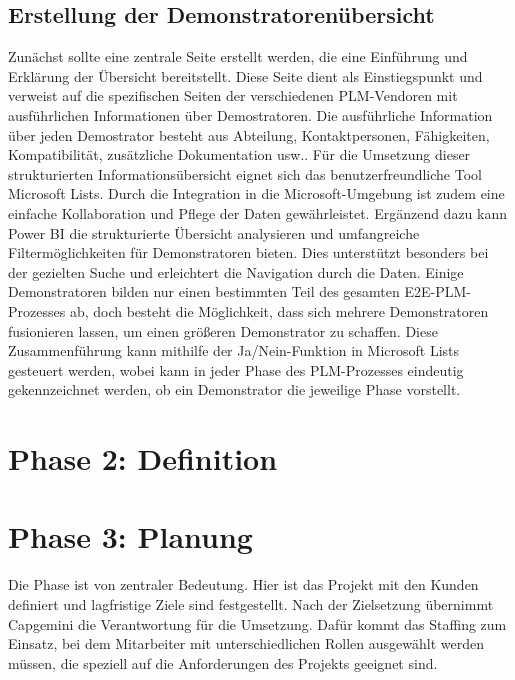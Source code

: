 \documentclass[a4paper, 12pt]{scrartcl}
\begin{document}
	\subsection{Erstellung der Demonstratorenübersicht}
Zunächst sollte eine zentrale Seite erstellt werden, die eine Einführung und Erklärung der Übersicht bereitstellt. Diese Seite dient als Einstiegspunkt und verweist auf die spezifischen Seiten der verschiedenen PLM-Vendoren mit ausführlichen Informationen über Demostratoren. Die ausführliche Information über jeden Demostrator besteht aus Abteilung, Kontaktpersonen, Fähigkeiten, Kompatibilität, zusätzliche Dokumentation usw.. Für die Umsetzung dieser strukturierten Informationsübersicht eignet sich das benutzerfreundliche Tool Microsoft Lists.\cite{List} Durch die Integration in die Microsoft-Umgebung ist zudem eine einfache Kollaboration und Pflege der Daten gewährleistet.\newline
Ergänzend dazu kann Power BI \cite{Power_bi} die strukturierte Übersicht analysieren und umfangreiche Filtermöglichkeiten für Demonstratoren bieten. Dies unterstützt besonders bei der gezielten Suche und erleichtert die Navigation durch die Daten.
Einige Demonstratoren bilden nur einen bestimmten Teil des gesamten E2E-PLM-Prozesses ab, doch besteht die Möglichkeit, dass sich mehrere Demonstratoren fusionieren lassen, um einen größeren Demonstrator zu schaffen. Diese Zusammenführung kann mithilfe der Ja/Nein-Funktion in Microsoft Lists gesteuert werden, wobei kann in jeder Phase des PLM-Prozesses eindeutig gekennzeichnet werden, ob ein Demonstrator die jeweilige Phase vorstellt.
	\section{Phase 2: Definition}
	\section{Phase 3: Planung}
Die Phase ist von zentraler Bedeutung. Hier ist das Projekt mit den Kunden definiert und lagfristige Ziele sind festgestellt. Nach der Zielsetzung übernimmt Capgemini die Verantwortung für die Umsetzung. Dafür kommt das Staffing zum Einsatz, bei dem Mitarbeiter mit unterschiedlichen Rollen ausgewählt werden müssen, die speziell auf die Anforderungen des Projekts geeignet sind.\cite{wegmann2006projektmanagement}
\end{document}
